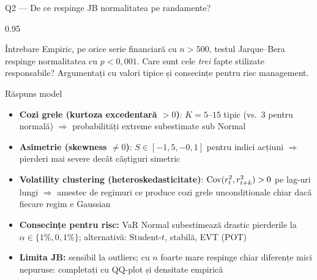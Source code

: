 \documentclass[9pt, aspectratio=169, t]{beamer}
\begin{document}
\begin{frame}[shrink=25]{Q2 --- De ce respinge JB normalitatea pe randamente?}
\begin{cminipage}{0.95\textwidth}
\begin{block}{Întrebare}
Empiric, pe orice serie financiară cu $n > 500$, testul Jarque--Bera respinge normalitatea cu $p < 0{,}001$. Care sunt cele \emph{trei} fapte stilizate responsabile? Argumentați cu valori tipice și consecințe pentru risc management.
\end{block}
\begin{exampleblock}{Răspuns model}
\begin{itemize}\setlength{\itemsep}{0pt}
    \item \textbf{Cozi grele (kurtoza excedentară $>0$)}: $K = 5$--$15$ tipic (vs.\ $3$ pentru normală) $\Rightarrow$ probabilități extreme subestimate sub Normal
    \item \textbf{Asimetrie (skewness $\ne 0$)}: $S \in [-1{,}5, -0{,}1]$ pentru indici acțiuni $\Rightarrow$ pierderi mai severe decât câștiguri simetric
    \item \textbf{Volatility clustering (heteroskedasticitate)}: $\text{Cov}(r_t^2, r_{t+k}^2) > 0$ pe lag-uri lungi $\Rightarrow$ amestec de regimuri ce produce cozi grele unconditionale chiar dacă fiecare regim e Gaussian
    \item \textbf{Consecințe pentru risc:} VaR Normal subestimează drastic pierderile la $\alpha \in \{1\%, 0{,}1\%\}$; alternativă: Student-$t$, stabilă, EVT (POT)
    \item \textbf{Limita JB:} sensibil la outliers; cu $n$ foarte mare respinge chiar diferențe mici nepuruse: completați cu QQ-plot și densitate empirică
\end{itemize}
\end{exampleblock}
\end{cminipage}
\end{frame}
\end{document}
